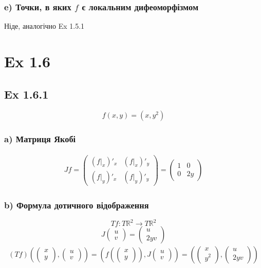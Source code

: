 \documentclass[10pt, a4paper]{article} %
\newcommand{\R}{\mathbb{R}}
\begin{document}
\subsubsection*{e) Точки, в яких $f$ є локальним дифеоморфізмом}
Ніде, аналогічно Ex 1.5.1

\section*{Ex 1.6}

\subsection*{Ex 1.6.1}
\[f(x,y) = (x,y^2)\]
\subsubsection*{a) Матриця Якобі}
\begin{align*}
    Jf = \begin{pmatrix}
        (f|_x)'_x & (f|_x)'_y\\
        (f|_y)'_x & (f|_y)'_y
    \end{pmatrix} 
    = \begin{pmatrix}
        1 & 0\\
        0 & 2y
    \end{pmatrix}
\end{align*}

\subsubsection*{b) Формула дотичного відображення}
\[Tf : T\R^2 \to T\R^2\]
\[J\begin{pmatrix}u\\v\end{pmatrix} = \begin{pmatrix}u\\2yv\end{pmatrix}\]
\begin{align*}
    (Tf)\left(\begin{pmatrix}x\\y\end{pmatrix} , \begin{pmatrix}u\\v\end{pmatrix}\right)
    = \left(f(\begin{pmatrix}x\\y\end{pmatrix}) , J\begin{pmatrix}u\\v\end{pmatrix}\right)
    = \left(\begin{pmatrix}x\\y^2\end{pmatrix} , \begin{pmatrix}u\\2yv\end{pmatrix}\right)
\end{align*}
\end{document}

